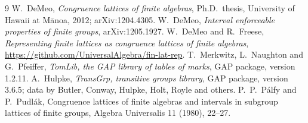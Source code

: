 \documentclass[11pt]{article}
\theoremstyle{remark}
\begin{document}
\begin{thebibliography}{9}
 W.~DeMeo, \emph{Congruence lattices of finite algebras}, Ph.D.\ thesis,
University of Hawaii at M\=anoa, 2012; arXiv:1204.4305.
 W.~DeMeo, \emph{Interval enforceable properties of finite groups},
arXiv:1205.1927.
 W.~DeMeo and R.~Freese, \emph{Representing finite lattices as congruence
lattices of finite algebras}, \url{https://github.com/UniversalAlgebra/fin-lat-rep}.
 T.~Merkwitz, L.~Naughton and G.~Pfeiffer, \emph{TomLib, the GAP library of tables of marks},
GAP package, version 1.2.11.
 A.~Hulpke, \emph{TransGrp, transitive groups library}, GAP package, version 3.6.5;
data by Butler, Conway, Hulpke, Holt, Royle and others.
 P.~P.\ P\'alfy and P.~Pudl\'ak, Congruence lattices of finite algebras and intervals
in subgroup lattices of finite groups, Algebra Universalis 11 (1980), 22--27.
\end{thebibliography}
\end{document}
